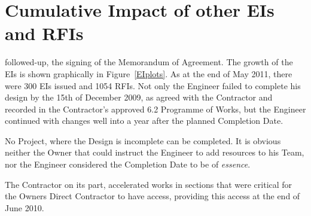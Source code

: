 \chapter{Cumulative Impact of other EIs and RFIs}
 followed-up, the signing of the Memorandum of Agreement. The growth of the EIs is shown graphically in Figure~\ref{EIplots}. As at the end of May 2011, there were 300 EIs issued and 1054 RFIs.
Not only the Engineer failed to complete his design by the 15th of December 2009, as agreed with the Contractor and recorded in the Contractor's approved 6.2 Programme of Works, but the Engineer continued with changes well into a year after the planned Completion Date.


\def\monthnames{{"D","J","F","M","A","M","J","J","A","S","O","N","D"}}
\pgfplotsset{width=16cm}

\begin{fullwidth}
\begin{figure*}[htbp]
\caption{Plots showing the growth of Engineer's Instructions and their relationship to Requests for Information, the relationship can be observed clearly. See for example the \textit{bumps} at around April-May 2010.}
\label{EIplots}
\end{figure*}
\end{fullwidth}

No Project, where the Design is incomplete can be completed. It is obvious neither the Owner that could instruct the Engineer to add resources to his Team, nor the Engineer considered the Completion Date to be of \textit{essence}.

The Contractor on its part, accelerated works in sections that were critical for the Owners Direct Contractor to have access, providing this access at the end of June 2010.
